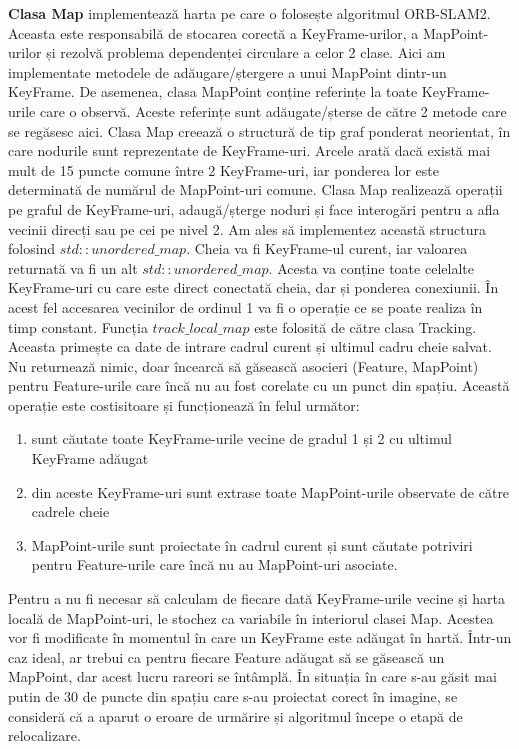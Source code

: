 \documentclass[12pt,a4paper]{report}
\begin{document}
\textbf{Clasa Map} implementează harta pe care o folosește algoritmul ORB-SLAM2. Aceasta este responsabilă
de stocarea corectă a KeyFrame-urilor, a MapPoint-urilor și rezolvă problema dependenței circulare
a celor 2 clase. Aici am implementate metodele de adăugare/ștergere a unui MapPoint dintr-un KeyFrame.
De asemenea, clasa MapPoint conține referințe la toate KeyFrame-urile care o observă. Aceste 
referințe sunt adăugate/șterse de către 2 metode care se regăsesc aici. Clasa Map creează o 
structură de tip graf ponderat neorientat, în care nodurile sunt reprezentate de KeyFrame-uri. 
Arcele arată dacă există mai mult de 15 puncte comune între 2 KeyFrame-uri, iar ponderea lor este 
determinată de numărul de MapPoint-uri comune. Clasa Map realizează operații pe graful de KeyFrame-uri,
adaugă/șterge noduri și face interogări pentru a afla vecinii direcți sau pe cei pe nivel 2. Am ales 
să implementez această structura folosind $ std::unordered\_map $. Cheia va fi KeyFrame-ul 
curent, iar valoarea returnată va fi un alt $ std::unordered\_map $. Acesta va conține toate celelalte
KeyFrame-uri cu care este direct conectată cheia, dar și ponderea conexiunii.
În acest fel accesarea vecinilor de ordinul 1 va fi o operație ce se poate realiza în timp constant.
Funcția $ track\_local\_map $ este folosită de către clasa Tracking. Aceasta primește ca date 
de intrare cadrul curent și ultimul cadru cheie salvat. Nu returnează nimic, doar încearcă 
să găsească asocieri (Feature, MapPoint) pentru Feature-urile care încă nu au fost corelate cu un punct 
din spațiu. Această operație este costisitoare și funcționează în felul următor:
\begin{enumerate}
    \item sunt căutate toate KeyFrame-urile vecine de gradul 1 și 2 cu ultimul KeyFrame adăugat
    \item din aceste KeyFrame-uri sunt extrase toate MapPoint-urile observate de către cadrele cheie 
    \item MapPoint-urile sunt proiectate în cadrul curent și sunt căutate potriviri pentru Feature-urile
care încă nu au MapPoint-uri asociate.
\end{enumerate}
Pentru a nu fi necesar să calculam de fiecare dată KeyFrame-urile vecine și  
harta locală de MapPoint-uri, le stochez ca variabile în interiorul clasei Map. Acestea vor 
fi modificate în momentul în care un KeyFrame este adăugat în hartă. Într-un caz ideal, ar 
trebui ca pentru fiecare Feature adăugat să se găsească un MapPoint, dar acest lucru rareori 
se întâmplă. În situația în care s-au găsit mai putin de 30 de puncte din spațiu care s-au 
proiectat corect în imagine, se consideră că a aparut o eroare de urmărire și algoritmul începe o
etapă de relocalizare. \\
\end{document}
